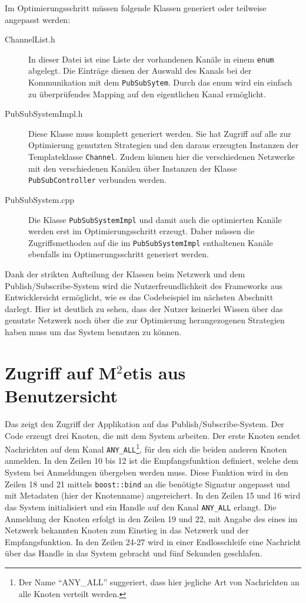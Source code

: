 Im Optimierungsschritt müssen folgende Klassen generiert oder teilweise angepasst werden:
\begin{description}
\item[ChannelList.h] In dieser Datei ist eine Liste der vorhandenen Kanäle in einem \texttt{enum} abgelegt. Die Einträge dienen der Auswahl des Kanals bei der Kommunikation mit dem \texttt{PubSubSytem}. Durch das enum wird ein einfach zu überprüfendes Mapping auf den eigentlichen Kanal ermöglicht.
\item[PubSubSystemImpl.h] Diese Klasse muss komplett generiert werden. Sie hat Zugriff auf alle zur Optimierung genutzten Strategien und den daraus erzeugten Instanzen der Templateklasse \texttt{Channel}. Zudem können hier die verschiedenen Netzwerke mit den verschiedenen Kanälen über Instanzen der Klasse \texttt{PubSubController} verbunden werden.
\item[PubSubSystem.cpp] Die Klasse \texttt{PubSubSystemImpl} und damit auch die optimierten Kanäle werden erst im Optimierungsschritt erzeugt. Daher müssen die Zugriffsmethoden auf die im \texttt{PubSubSystemImpl} enthaltenen Kanäle ebenfalls im Optimerungsschritt generiert werden.
\end{description}

Dank der strikten Aufteilung der Klassen beim Netzwerk und dem Publish/Subscribe-System wird die Nutzerfreundlichkeit des Frameworks aus Entwicklersicht ermöglicht, wie es das Codebeispiel im nächsten Abschnitt darlegt. Hier ist deutlich zu sehen, dass der Nutzer keinerlei Wissen über das genutzte Netzwerk noch über die zur Optimierung herangezogenen Strategien haben muss um das System benutzen zu können.

\section*{Zugriff auf M$^2$etis aus Benutzersicht}
Das  zeigt den Zugriff der Applikation auf das Publish/Subscribe-System. Der Code erzeugt drei Knoten, die mit dem System arbeiten. Der erste Knoten sendet Nachrichten auf dem Kanal \texttt{ANY\_ALL}\footnote{Der Name \enquote{ANY\_ALL} suggeriert, dass hier jegliche Art von Nachrichten an alle Knoten verteilt werden.}, für den sich die beiden anderen Knoten anmelden. In den Zeilen 10 bis 12 ist die Empfangsfunktion definiert, welche dem System bei Anmeldungen übergeben werden muss. Diese Funktion wird in den Zeilen 18 und 21 mittels \texttt{boost::bind} an die benötigte Signatur angepasst und mit Metadaten (hier der Knotenname) angereichert. In den Zeilen 15 und 16 wird das System initialisiert und ein Handle auf den Kanal \texttt{ANY\_ALL} erlangt. Die Anmeldung der Knoten erfolgt in den Zeilen 19 und 22, mit Angabe des eines im Netzwerk bekannten Knoten zum Einstieg in das Netzwerk und der Empfangsfunktion. In den Zeilen 24-27 wird in einer Endlosschleife eine Nachricht über das Handle in das System gebracht und fünf Sekunden geschlafen.

